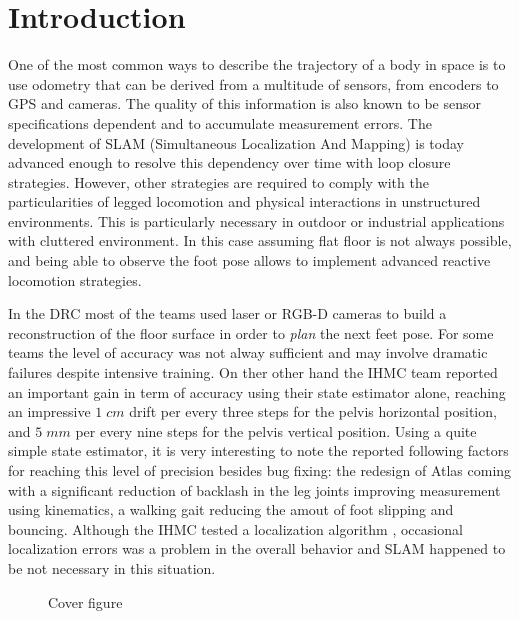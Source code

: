 
\section{Introduction}\label{sec:intro}

One of the most common ways to describe the trajectory of a body in space is to use odometry that can be derived from a multitude of sensors, from encoders to GPS and cameras.
The quality of this information is also known to be sensor specifications dependent and to accumulate measurement errors. The development of SLAM (Simultaneous Localization And Mapping) is today advanced enough to resolve 
this dependency over time with loop closure strategies. However, other strategies are required to comply with the particularities of legged locomotion and physical interactions in unstructured environments. 
This is particularly necessary in outdoor or industrial applications with cluttered environment. 
In this case assuming flat floor is not always possible, and being able to observe the foot pose allows to implement advanced
reactive locomotion strategies.

In the DRC \cite{Johnson:jof:2016,Marion:jof:2017,Karumanchi:jof:2017} most of the teams used laser or RGB-D cameras to build a reconstruction of the floor surface in order to \emph{plan}
the next feet pose. For some teams the level of accuracy was not alway sufficient and may involve dramatic failures \cite{Kaneko:ichr:2015}
despite intensive training.
On ther other hand the IHMC team \cite{Johnson:jof:2016} reported an important gain in term of accuracy using their state estimator alone,
reaching an impressive $1\; cm$ drift per every three steps for the pelvis horizontal position,
and $5\; mm$ per every nine steps for the pelvis vertical position. Using a quite simple state estimator,
it is very interesting to note the reported following factors for reaching this level of precision besides bug fixing:
the redesign of Atlas coming with a significant reduction of backlash in the leg joints improving measurement
using kinematics, a walking gait reducing the amout of foot slipping and bouncing.
Although the IHMC tested a localization algorithm \cite{Pomerlau:ar:2013}, occasional localization errors was
a problem in the overall behavior and SLAM happened to be not necessary in this situation.

\begin{figure}
\centering
	\caption{Cover figure}
	\label{fig:cover}
\end{figure}

